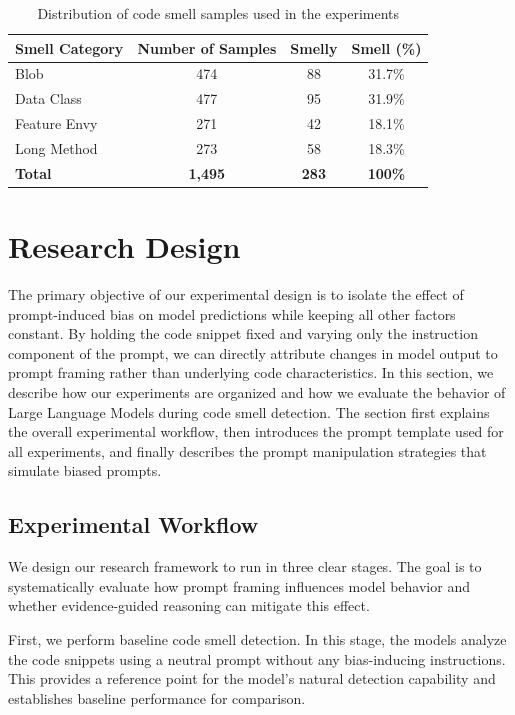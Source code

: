 \documentclass[sigconf,review,anonymous]{acmart}
\begin{document}
\begin{table}[t]
\caption{Distribution of code smell samples used in the experiments}
\label{tab:dataset}
\begin{tabular}{lccc}
\toprule
\textbf{Smell Category} & \textbf{Number of Samples} & \textbf{Smelly} & \textbf{Smell (\%)} \\
\midrule  
Blob & 474 & 88 & 31.7\% \\
Data Class & 477 & 95 & 31.9\% \\
Feature Envy & 271 & 42 & 18.1\% \\
Long Method & 273 & 58 & 18.3\% \\
\midrule
\textbf{Total} & \textbf{1,495} & \textbf{283} & \textbf{100\%} \\
\bottomrule
\end{tabular}
\end{table}

\section{Research Design}

The primary objective of our experimental design is to isolate the effect of prompt-induced bias on model predictions while keeping all other factors constant. By holding the code snippet fixed and varying only the instruction component of the prompt, we can directly attribute changes in model output to prompt framing rather than underlying code characteristics. In this section, we describe how our experiments are organized and how we evaluate the behavior of Large Language Models during code smell detection. The section first explains the overall experimental workflow, then introduces the prompt template used for all experiments, and finally describes the prompt manipulation strategies that simulate biased prompts.

\subsection{Experimental Workflow}

We design our research framework to run in three clear stages. The goal is to systematically evaluate how prompt framing influences model behavior and whether evidence-guided reasoning can mitigate this effect.

First, we perform baseline code smell detection. In this stage, the models analyze the code snippets using a neutral prompt without any bias-inducing instructions. This provides a reference point for the model’s natural detection capability and establishes baseline performance for comparison.
\end{document}
